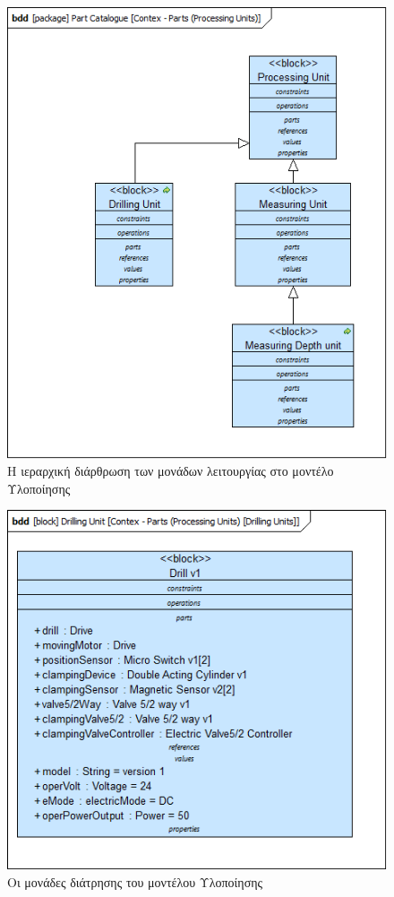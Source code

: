 \documentclass[a4paper,12pt,twoside]{report}
\begin{document}
{\begin{appendices}
				\begin{figure}[hp]
					\centering
					\includegraphics[scale=0.50]{DesignModel_Contex-Parts(ProcessingUnits).png}
					\caption{Η ιεραρχική διάρθρωση των μονάδων λειτουργίας στο μοντέλο Υλοποίησης}
					\label{φωτ:Η ιεραρχική διάρθρωση των μονάδων λειτουργίας στο μοντέλο Υλοποίησης}
				\end{figure}
				
				\begin{figure}[hp]
					\centering
					\includegraphics[scale=0.50]{DesignModel_Contex-Parts(ProcessingUnits)[DrillingUnits].png}
					\caption{Οι μονάδες διάτρησης του μοντέλου Υλοποίησης}
					\label{φωτ:Οι μονάδες διάτρησης του μοντέλου Υλοποίησης}
				\end{figure}
				

\end{appendices}}
\end{document}
